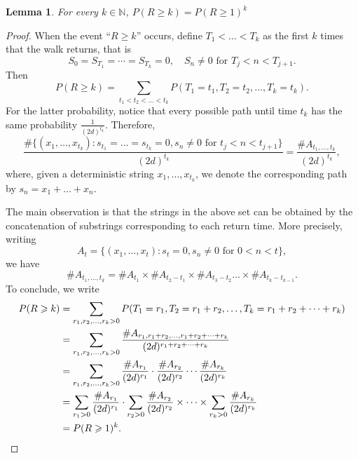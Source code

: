 \documentclass[a4paper,12pt]{article}
\newtheorem{lemma}[equation]{Lemma}
\theoremstyle{definition}
\newcommand{\N}{\mathbb{N}}
\renewcommand{\geq}{\geqslant}
\renewcommand{\ge}{\geqslant}
\begin{document}
\begin{lemma}
For every $k\in\N$,
\(
P(R \ge k) = P(R \geq 1)^k
\)
\end{lemma}
\begin{proof}
When the event ``$R\geq k$'' occurs, define $T_1<\dots<T_k$ as the first $k$ times that the walk returns, that is
\[
S_0=S_{T_1}=\cdots=S_{T_k}=0,
\quad
S_n \ne 0 \text{ for } T_{j} < n < T_{j+1}
.
\]
Then
\[
P(R \geq k)
=
\sum_{t_1<t_2<\dots<t_k}
P(T_1=t_1,T_2=t_2,\dots, T_k=t_k)
.
\]
For the latter probability, notice that every possible path until time $t_k$ has the same probability $\frac{1}{(2d)^{t_k}}$.
Therefore,
\[
\frac{\#\{(x_1,\dots,x_{t_k}) : s_{t_1}=\dots=s_{t_k}=0, s_n\ne 0 \text{ for } t_j<n<t_{j+1}\}}
{(2d)^{t_k}}
=
\frac{\# A_{t_1,\dots,t_k}}{(2d)^{t_k}}
,
\]
where, given a deterministic string $x_1,\dots,x_{t_k}$, we denote the corresponding path by $s_n=x_1+\dots+x_n$.

The main observation is that the strings in the above set can be obtained by the concatenation of substrings corresponding to each return time.
More precisely, writing
\[
A_t = \{(x_1,\dots,x_t):s_t=0, s_n \ne 0 \text{ for } 0<n<t\}
,
\]
we have
\[
\# A_{t_1,\dots,t_k} = \# A_{t_1} \times \# A_{t_2-t_1} \times \# A_{t_3-t_2} \dots \times \# A_{t_k-t_{k-1}}
.
\]
To conclude, we write
\begin{align*}
P(R \geq k)
& =
\sum_{r_1,r_2,\dots,r_k>0}
P(T_1=r_1,T_2=r_1+r_2,\dots, T_k=r_1+r_2+\dots+r_k)
\\
& =
\sum_{r_1,r_2,\dots,r_k>0}
\frac{\# A_{r_1,r_1+r_2,\dots,r_1+r_2+\dots+r_k}}{(2d)^{r_1+r_2+\dots+r_k}}
\\
& =
\sum_{r_1,r_2,\dots,r_k>0}
\frac{\# A_{r_1}}{(2d)^{r_1}}
\cdot
\frac{\# A_{r_2}}{(2d)^{r_2}}
\cdots
\frac{\# A_{r_k}}{(2d)^{r_k}}
\\
& =
\sum_{r_1>0}
\frac{\# A_{r_1}}{(2d)^{r_1}}
\cdot
\sum_{r_2>0}
\frac{\# A_{r_2}}{(2d)^{r_2}}
\times
\cdots
\times
\sum_{r_k>0}
\frac{\# A_{r_k}}{(2d)^{r_k}}
\\
& =
P(R \geq 1)^k
.
\qedhere
\end{align*}


\end{proof}
\end{document}
